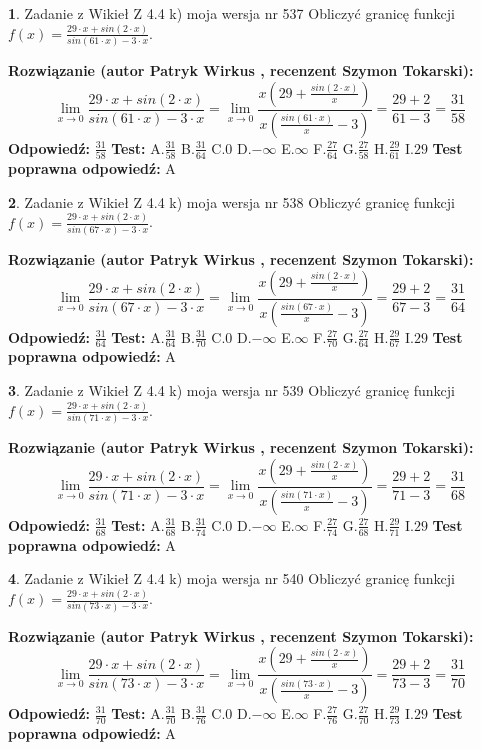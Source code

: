 \documentclass[12pt, a4paper]{article}
\theoremstyle{definition} %
\newtheorem{zad}{}
\newcommand{\zadStart}[1]{\begin{zad}#1\newline}
\newcommand{\zadStop}{\end{zad}}
\newcommand{\rozwStart}[2]{\noindent \textbf{Rozwiązanie (autor #1 , recenzent #2): }\newline}
\newcommand{\rozwStop}{\newline}
\newcommand{\odpStart}{\noindent \textbf{Odpowiedź:}\newline}
\newcommand{\odpStop}{\newline}
\newcommand{\testStart}{\noindent \textbf{Test:}\newline}
\newcommand{\testStop}{\newline}
\newcommand{\kluczStart}{\noindent \textbf{Test poprawna odpowiedź:}\newline}
\newcommand{\kluczStop}{\newline}
\begin{document}
\zadStart{Zadanie z Wikieł Z 4.4 k) moja wersja nr 537}
Obliczyć granicę funkcji $f(x)=\frac{29\cdot x +sin(2\cdot x)}{sin(61\cdot x) -3\cdot x}$.
\zadStop
\rozwStart{Patryk Wirkus}{Szymon Tokarski}
$$\lim\limits_{x\to 0}\frac{29\cdot x +sin(2\cdot x)}{sin(61\cdot x) -3\cdot x}
=\lim\limits_{x\to 0}\frac{x(29+\frac{sin(2\cdot x)}{x})}{x(\frac{sin(61\cdot x)}{x}-3)}
=\frac{29+2}{61-3} = \frac{31}{58}$$
\rozwStop
\odpStart
$\frac{31}{58}$
\odpStop
\testStart
A.$\frac{31}{58}$
B.$\frac{31}{64}$
C.$0$
D.$-\infty$
E.$\infty$
F.$\frac{27}{64}$
G.$\frac{27}{58}$
H.$\frac{29}{61}$
I.$29$
\testStop
\kluczStart
A
\kluczStop



\zadStart{Zadanie z Wikieł Z 4.4 k) moja wersja nr 538}
Obliczyć granicę funkcji $f(x)=\frac{29\cdot x +sin(2\cdot x)}{sin(67\cdot x) -3\cdot x}$.
\zadStop
\rozwStart{Patryk Wirkus}{Szymon Tokarski}
$$\lim\limits_{x\to 0}\frac{29\cdot x +sin(2\cdot x)}{sin(67\cdot x) -3\cdot x}
=\lim\limits_{x\to 0}\frac{x(29+\frac{sin(2\cdot x)}{x})}{x(\frac{sin(67\cdot x)}{x}-3)}
=\frac{29+2}{67-3} = \frac{31}{64}$$
\rozwStop
\odpStart
$\frac{31}{64}$
\odpStop
\testStart
A.$\frac{31}{64}$
B.$\frac{31}{70}$
C.$0$
D.$-\infty$
E.$\infty$
F.$\frac{27}{70}$
G.$\frac{27}{64}$
H.$\frac{29}{67}$
I.$29$
\testStop
\kluczStart
A
\kluczStop



\zadStart{Zadanie z Wikieł Z 4.4 k) moja wersja nr 539}
Obliczyć granicę funkcji $f(x)=\frac{29\cdot x +sin(2\cdot x)}{sin(71\cdot x) -3\cdot x}$.
\zadStop
\rozwStart{Patryk Wirkus}{Szymon Tokarski}
$$\lim\limits_{x\to 0}\frac{29\cdot x +sin(2\cdot x)}{sin(71\cdot x) -3\cdot x}
=\lim\limits_{x\to 0}\frac{x(29+\frac{sin(2\cdot x)}{x})}{x(\frac{sin(71\cdot x)}{x}-3)}
=\frac{29+2}{71-3} = \frac{31}{68}$$
\rozwStop
\odpStart
$\frac{31}{68}$
\odpStop
\testStart
A.$\frac{31}{68}$
B.$\frac{31}{74}$
C.$0$
D.$-\infty$
E.$\infty$
F.$\frac{27}{74}$
G.$\frac{27}{68}$
H.$\frac{29}{71}$
I.$29$
\testStop
\kluczStart
A
\kluczStop



\zadStart{Zadanie z Wikieł Z 4.4 k) moja wersja nr 540}
Obliczyć granicę funkcji $f(x)=\frac{29\cdot x +sin(2\cdot x)}{sin(73\cdot x) -3\cdot x}$.
\zadStop
\rozwStart{Patryk Wirkus}{Szymon Tokarski}
$$\lim\limits_{x\to 0}\frac{29\cdot x +sin(2\cdot x)}{sin(73\cdot x) -3\cdot x}
=\lim\limits_{x\to 0}\frac{x(29+\frac{sin(2\cdot x)}{x})}{x(\frac{sin(73\cdot x)}{x}-3)}
=\frac{29+2}{73-3} = \frac{31}{70}$$
\rozwStop
\odpStart
$\frac{31}{70}$
\odpStop
\testStart
A.$\frac{31}{70}$
B.$\frac{31}{76}$
C.$0$
D.$-\infty$
E.$\infty$
F.$\frac{27}{76}$
G.$\frac{27}{70}$
H.$\frac{29}{73}$
I.$29$
\testStop
\kluczStart
A
\kluczStop
\end{document}
